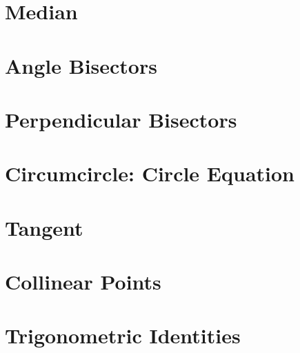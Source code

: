 \documentclass[journal]{IEEEtran}
\begin{document}
\section{Median}

\section{Angle Bisectors}

\section{Perpendicular Bisectors}

\section{Circumcircle: Circle Equation}

\section{Tangent}

%
\appendices

\section{Collinear Points}

\section{Trigonometric Identities}

%
\end{document}
